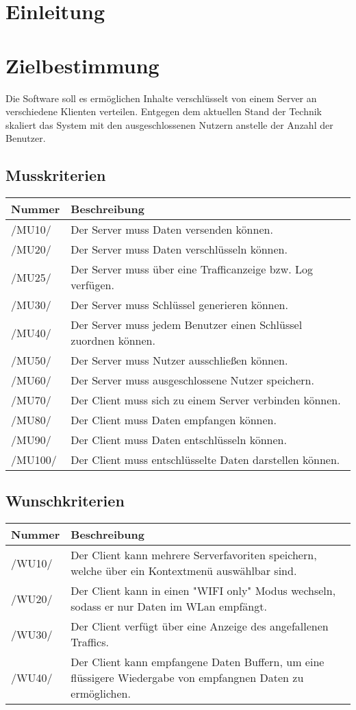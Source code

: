 \documentclass[a4paper,10pt]{article}
\title{\doctitle}
\author{\authorName}
\date{\today}
\newcommand\addrow[2]{#1 &#2\\ }
\newcommand\addheading[2]{#1 &#2\\ \hline}
\newcommand\tabularhead{\begin{tabular}{lp{13cm}}
\hline
}
\newenvironment{usecase}{\tabularhead}
{\hline\end{tabular}}
\begin{document}

\tableofcontents


\section{Einleitung}
\section{Zielbestimmung}
Die Software soll es ermöglichen Inhalte verschlüsselt von einem Server an verschiedene Klienten verteilen. Entgegen dem aktuellen Stand der Technik skaliert das System mit den ausgeschlossenen Nutzern anstelle der Anzahl der Benutzer.


\subsection{Musskriterien}
\newcommand{\mussKuerzel}{MU}
\begin{usecase}
\addheading{Nummer}{Beschreibung}
\addrow{/\mussKuerzel10/} {Der Server muss Daten versenden können.}
\addrow{/\mussKuerzel20/} {Der Server muss Daten verschlüsseln können.}
\addrow{/\mussKuerzel25/} {Der Server muss über eine Trafficanzeige bzw. Log verfügen.}
\addrow{/\mussKuerzel30/} {Der Server muss Schlüssel generieren können.}
\addrow{/\mussKuerzel40/} {Der Server muss jedem Benutzer einen Schlüssel zuordnen können.}
\addrow{/\mussKuerzel50/} {Der Server muss Nutzer ausschließen können.}
\addrow{/\mussKuerzel60/} {Der Server muss ausgeschlossene Nutzer speichern.}
\addrow{/\mussKuerzel70/} {Der Client muss sich zu einem Server verbinden können.}
\addrow{/\mussKuerzel80/} {Der Client muss Daten empfangen können.}
\addrow{/\mussKuerzel90/} {Der Client muss Daten entschlüsseln können.}
\addrow{/\mussKuerzel100/} {Der Client muss entschlüsselte Daten darstellen können.}
\end{usecase}

\subsection{Wunschkriterien}
\newcommand{\wunschKuerzel}{WU}
\begin{usecase}
\addheading{Nummer}{Beschreibung}
\addrow{/\wunschKuerzel10/} {Der Client kann mehrere Serverfavoriten speichern, welche über ein Kontextmenü auswählbar sind.}
\addrow{/\wunschKuerzel20/} {Der Client kann in einen "WIFI only" Modus wechseln, sodass er nur Daten im WLan empfängt.}
\addrow{/\wunschKuerzel30/} {Der Client verfügt über eine Anzeige des angefallenen Traffics.}
\addrow{/\wunschKuerzel40/} {Der Client kann empfangene Daten Buffern, um eine flüssigere Wiedergabe von empfangnen Daten zu ermöglichen.}
\end{usecase}
\end{document}
